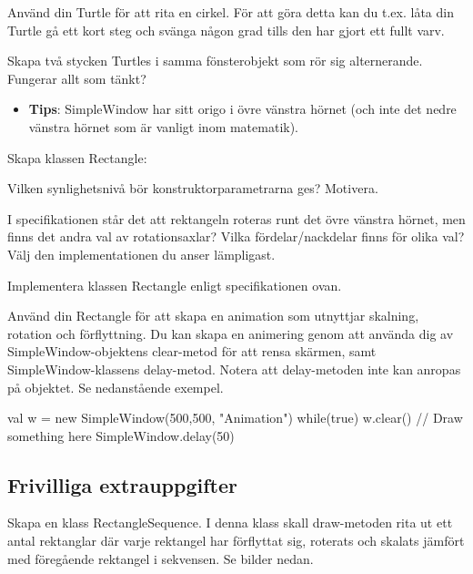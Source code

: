 \Subtask Använd din Turtle för att rita en cirkel. För att göra detta kan du t.ex. låta din Turtle gå ett kort steg och svänga någon grad tills den har gjort ett fullt varv.

\Subtask Skapa två stycken Turtles i samma fönsterobjekt som rör sig alternerande. Fungerar allt som tänkt?

\begin{itemize}
\item \textbf{Tips}: SimpleWindow har sitt origo i övre vänstra hörnet (och inte det nedre vänstra hörnet som är vanligt inom matematik).
\end{itemize}

\Task Skapa klassen Rectangle:

\vspace{1em}%

\Subtask Vilken synlighetsnivå bör konstruktorparametrarna ges? Motivera.

\Subtask I specifikationen står det att rektangeln roteras runt det övre vänstra hörnet, men finns det andra val av rotationsaxlar? Vilka fördelar/nackdelar finns för olika val?
Välj den implementationen du anser lämpligast.

\Subtask Implementera klassen Rectangle enligt specifikationen ovan.

\Subtask Använd din Rectangle för att skapa en animation som utnyttjar skalning, rotation och förflyttning.
Du kan skapa en animering genom att använda dig av SimpleWindow-objektens clear-metod för att rensa skärmen, samt SimpleWindow-klassens delay-metod.
Notera att delay-metoden inte kan anropas på objektet. Se nedanstående exempel.

\begin{Code}
val w = new SimpleWindow(500,500, "Animation")
while(true){
	w.clear()
	// Draw something here
	SimpleWindow.delay(50)
}
\end{Code}


\clearpage

\subsection{Frivilliga extrauppgifter}


\Task Skapa en klass RectangleSequence. I denna klass skall draw-metoden rita ut ett antal rektanglar där varje rektangel har förflyttat sig, roterats och skalats jämfört med föregående rektangel i sekvensen. Se bilder nedan.


